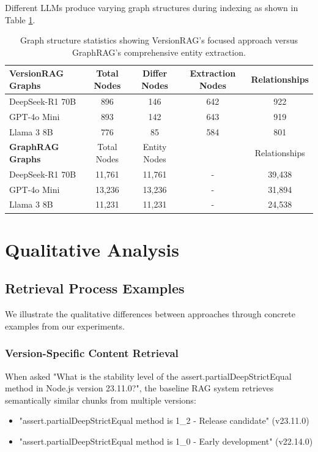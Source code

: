 Different LLMs produce varying graph structures during indexing as shown in Table \ref{tab:graph_structure_complexity_by_model}.

\begin{table}[ht]
\centering
\small
\caption{Graph structure statistics showing VersionRAG's focused approach versus GraphRAG's comprehensive entity extraction.}
\begin{tabular}{lcccc}
\hline
\textbf{VersionRAG Graphs} & Total Nodes & Differ Nodes & Extraction Nodes & Relationships \\ \hline
DeepSeek-R1 70B & 896 & 146 & 642 & 922 \\
GPT-4o Mini & 893 & 142 & 643 & 919 \\
Llama 3 8B & 776 & 85 & 584 & 801 \\ \hline
\textbf{GraphRAG Graphs} & Total Nodes & Entity Nodes & & Relationships \\ \hline
DeepSeek-R1 70B & 11,761 & 11,761 & - & 39,438 \\
GPT-4o Mini & 13,236 & 13,236 & - & 31,894 \\
Llama 3 8B & 11,231 & 11,231 & - & 24,538 \\ \hline
\end{tabular}
\label{tab:graph_structure_complexity_by_model}
\end{table}


\section{Qualitative Analysis}

\subsection{Retrieval Process Examples}

We illustrate the qualitative differences between approaches through concrete examples from our experiments.

\subsubsection{Version-Specific Content Retrieval}

When asked "What is the stability level of the assert.partialDeepStrictEqual method in Node.js version 23.11.0?", the baseline RAG system retrieves semantically similar chunks from multiple versions:
\begin{itemize}
    \item "assert.partialDeepStrictEqual method is 1\_2 - Release candidate" (v23.11.0)
    \item "assert.partialDeepStrictEqual method is 1\_0 - Early development" (v22.14.0)
\end{itemize}

